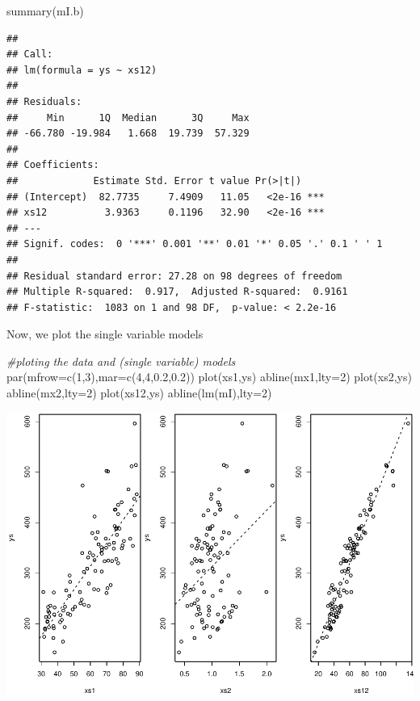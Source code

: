 \documentclass[
]{book}
\newenvironment{Shaded}{\begin{snugshade}}{\end{snugshade}}
\newcommand{\AttributeTok}[1]{\textcolor[rgb]{0.77,0.63,0.00}{#1}}
\newcommand{\CommentTok}[1]{\textcolor[rgb]{0.56,0.35,0.01}{\textit{#1}}}
\newcommand{\DecValTok}[1]{\textcolor[rgb]{0.00,0.00,0.81}{#1}}
\newcommand{\FloatTok}[1]{\textcolor[rgb]{0.00,0.00,0.81}{#1}}
\newcommand{\FunctionTok}[1]{\textcolor[rgb]{0.00,0.00,0.00}{#1}}
\newcommand{\NormalTok}[1]{#1}
\begin{document}
\begin{Shaded}
\begin{Highlighting}[]
\FunctionTok{summary}\NormalTok{(mI.b)}
\end{Highlighting}
\end{Shaded}

\begin{verbatim}
## 
## Call:
## lm(formula = ys ~ xs12)
## 
## Residuals:
##     Min      1Q  Median      3Q     Max 
## -66.780 -19.984   1.668  19.739  57.329 
## 
## Coefficients:
##             Estimate Std. Error t value Pr(>|t|)    
## (Intercept)  82.7735     7.4909   11.05   <2e-16 ***
## xs12          3.9363     0.1196   32.90   <2e-16 ***
## ---
## Signif. codes:  0 '***' 0.001 '**' 0.01 '*' 0.05 '.' 0.1 ' ' 1
## 
## Residual standard error: 27.28 on 98 degrees of freedom
## Multiple R-squared:  0.917,  Adjusted R-squared:  0.9161 
## F-statistic:  1083 on 1 and 98 DF,  p-value: < 2.2e-16
\end{verbatim}

Now, we plot the single variable models

\begin{Shaded}
\begin{Highlighting}[]
\CommentTok{\#ploting the data and (single variable) models}
\FunctionTok{par}\NormalTok{(}\AttributeTok{mfrow=}\FunctionTok{c}\NormalTok{(}\DecValTok{1}\NormalTok{,}\DecValTok{3}\NormalTok{),}\AttributeTok{mar=}\FunctionTok{c}\NormalTok{(}\DecValTok{4}\NormalTok{,}\DecValTok{4}\NormalTok{,}\FloatTok{0.2}\NormalTok{,}\FloatTok{0.2}\NormalTok{))}
\FunctionTok{plot}\NormalTok{(xs1,ys)}
\FunctionTok{abline}\NormalTok{(mx1,}\AttributeTok{lty=}\DecValTok{2}\NormalTok{)}
\FunctionTok{plot}\NormalTok{(xs2,ys)}
\FunctionTok{abline}\NormalTok{(mx2,}\AttributeTok{lty=}\DecValTok{2}\NormalTok{)}
\FunctionTok{plot}\NormalTok{(xs12,ys)}
\FunctionTok{abline}\NormalTok{(}\FunctionTok{lm}\NormalTok{(mI),}\AttributeTok{lty=}\DecValTok{2}\NormalTok{)}
\end{Highlighting}
\end{Shaded}

\includegraphics{ECOMODbook_files/figure-latex/a12.5-1.pdf}
\end{document}
